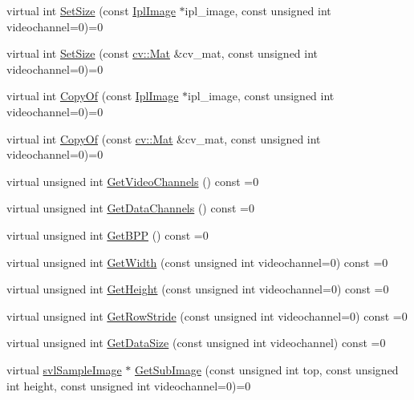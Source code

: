 \begin{DoxyCompactItemize}
virtual int \hyperlink{classsvl_sample_image_a17e6ad84e31a3c4848773c01a6c811c2}{Set\+Size} (const \hyperlink{svl_types_8h_aa5a40a13021ba9708bfe921e18fdfa53}{Ipl\+Image} $\ast$ipl\+\_\+image, const unsigned int videochannel=0)=0
\item 
virtual int \hyperlink{classsvl_sample_image_a57255ee3dc0fd9509f9aa22eb5c85fa4}{Set\+Size} (const \hyperlink{namespacecv_a60d81b54f4914bec4cc4a72ab77eb444}{cv\+::\+Mat} \&cv\+\_\+mat, const unsigned int videochannel=0)=0
\item 
virtual int \hyperlink{classsvl_sample_image_ad39690ff5f70bcf7a7dc632be9760656}{Copy\+Of} (const \hyperlink{svl_types_8h_aa5a40a13021ba9708bfe921e18fdfa53}{Ipl\+Image} $\ast$ipl\+\_\+image, const unsigned int videochannel=0)=0
\item 
virtual int \hyperlink{classsvl_sample_image_a97a0bece9ac692866587712372a8b162}{Copy\+Of} (const \hyperlink{namespacecv_a60d81b54f4914bec4cc4a72ab77eb444}{cv\+::\+Mat} \&cv\+\_\+mat, const unsigned int videochannel=0)=0
\item 
virtual unsigned int \hyperlink{classsvl_sample_image_a50d7ca3459272a2dd7b7ee68dabd6e54}{Get\+Video\+Channels} () const =0
\item 
virtual unsigned int \hyperlink{classsvl_sample_image_a473f2373ddcc8db26f7770e9a093801f}{Get\+Data\+Channels} () const =0
\item 
virtual unsigned int \hyperlink{classsvl_sample_image_a4202b640e742ec266078b00a9b8afa0e}{Get\+B\+P\+P} () const =0
\item 
virtual unsigned int \hyperlink{classsvl_sample_image_a93493be70fead7b2020810512129e45f}{Get\+Width} (const unsigned int videochannel=0) const =0
\item 
virtual unsigned int \hyperlink{classsvl_sample_image_ae9b31054c61c8aa90fd57753bf573456}{Get\+Height} (const unsigned int videochannel=0) const =0
\item 
virtual unsigned int \hyperlink{classsvl_sample_image_a48bd873cc1b46bf5f18157451b7f8fdd}{Get\+Row\+Stride} (const unsigned int videochannel=0) const =0
\item 
virtual unsigned int \hyperlink{classsvl_sample_image_a9b5b050e77a24299d0f08fcfefe6599d}{Get\+Data\+Size} (const unsigned int videochannel) const =0
\item 
virtual \hyperlink{classsvl_sample_image}{svl\+Sample\+Image} $\ast$ \hyperlink{classsvl_sample_image_a1fc3d0662cfd58ae96ab4a3b1724d690}{Get\+Sub\+Image} (const unsigned int top, const unsigned int height, const unsigned int videochannel=0)=0

\end{DoxyCompactItemize}
